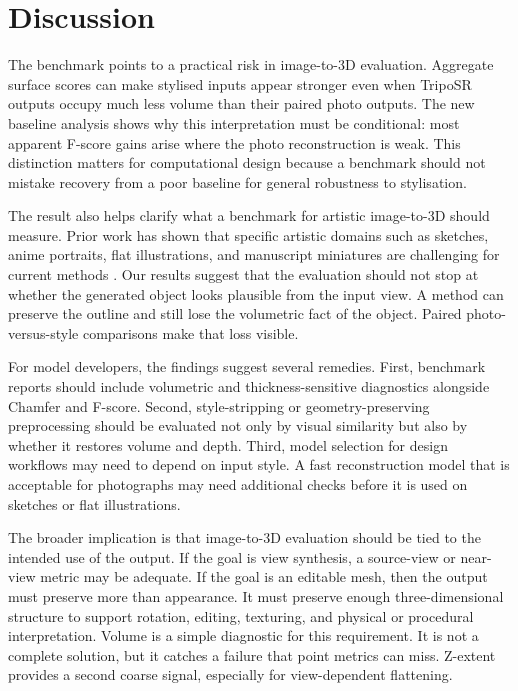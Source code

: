 \documentclass[12pt,a4paper]{article}
\begin{document}
\section{Discussion}

The benchmark points to a practical risk in image-to-3D evaluation. Aggregate surface scores can make stylised inputs appear stronger even when TripoSR outputs occupy much less volume than their paired photo outputs. The new baseline analysis shows why this interpretation must be conditional: most apparent F-score gains arise where the photo reconstruction is weak. This distinction matters for computational design because a benchmark should not mistake recovery from a poor baseline for general robustness to stylisation.

The result also helps clarify what a benchmark for artistic image-to-3D should measure. Prior work has shown that specific artistic domains such as sketches, anime portraits, flat illustrations, and manuscript miniatures are challenging for current methods \parencite{sanghi2023sketchashape,chen2023panic3d,cong2025art3d,pallotto2026miniatures}. Our results suggest that the evaluation should not stop at whether the generated object looks plausible from the input view. A method can preserve the outline and still lose the volumetric fact of the object. Paired photo-versus-style comparisons make that loss visible.

For model developers, the findings suggest several remedies. First, benchmark reports should include volumetric and thickness-sensitive diagnostics alongside Chamfer and F-score. Second, style-stripping or geometry-preserving preprocessing should be evaluated not only by visual similarity but also by whether it restores volume and depth. Third, model selection for design workflows may need to depend on input style. A fast reconstruction model that is acceptable for photographs may need additional checks before it is used on sketches or flat illustrations.

The broader implication is that image-to-3D evaluation should be tied to the intended use of the output. If the goal is view synthesis, a source-view or near-view metric may be adequate. If the goal is an editable mesh, then the output must preserve more than appearance. It must preserve enough three-dimensional structure to support rotation, editing, texturing, and physical or procedural interpretation. Volume is a simple diagnostic for this requirement. It is not a complete solution, but it catches a failure that point metrics can miss. Z-extent provides a second coarse signal, especially for view-dependent flattening.
\end{document}
